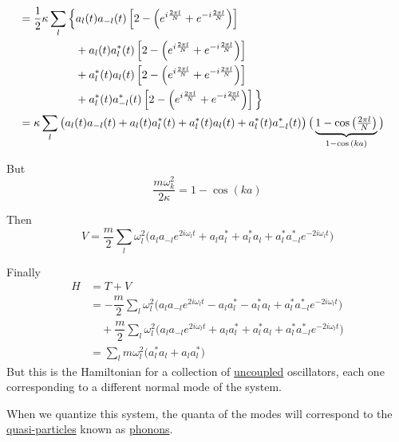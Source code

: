 \documentclass{article}
\begin{document}
\begin{align*}
    \\
    &= \frac{1}{2} \kappa \sum_l \Big\lbrace a_l (t) a_{-l} (t) \left[ 2 - \left( e^{i \frac{2 \pi l}{N}} + e^{-i \frac{2 \pi l}{N}} \right) \right] \\
    & \hspace{0.7in} + a_l (t) a_l^* (t) \left[ 2 - \left( e^{i \frac{2 \pi l}{N}} + e^{-i \frac{2 \pi l}{N}} \right) \right] \\
    & \hspace{0.7in} + a_l^* (t) a_l (t) \left[ 2 - \left( e^{i \frac{2 \pi l}{N}} + e^{-i \frac{2 \pi l}{N}} \right) \right] \\
    & \hspace{0.7in} + a_l^* (t) a_{-l}^* (t) \left[ 2 - \left( e^{i \frac{2 \pi l}{N}} + e^{-i \frac{2 \pi l}{N}} \right) \right] \Big\rbrace \\
    &= \kappa \sum_l \left( a_l (t) a_{-l} (t) + a_l (t) a_l^* (t) + a_l^* (t) a_l (t) + a_l^* (t) a_{-l}^* (t) \right) \big( \underbrace{ 1 - \cos{\left( \tfrac{ 2 \pi l }{N} \right)} }_{ 1 - \cos{(ka)} } \big)
\end{align*}
\endgroup


\noindent But
\begin{equation*}
    \dfrac{ m \omega_k^2 }{ 2 \kappa } =  1 - \cos{(ka)}
\end{equation*}

\noindent Then
\begin{equation*}
    V = \dfrac{m}{2} \sum_l \omega_l^2 \Big( a_l a_{-l} e^{ 2i \omega_l t } + a_l a_l^* + a_l^* a_l + a_l^* a_{-l}^* e^{ -2i \omega_l t } \Big)
\end{equation*}

\noindent Finally
\begin{align*}
    H &= T + V \\
    &= - \dfrac{m}{2} \sum_l \omega_l^2 \Big( a_l a_{-l} e^{ 2i \omega_l t } - a_l a_l^* - a_l^* a_l + a_l^* a_{-l}^* e^{ -2i \omega_l t } \Big) \\
    & \quad + \dfrac{m}{2} \sum_l \omega_l^2 \Big( a_l a_{-l} e^{ 2i \omega_l t } + a_l a_l^* + a_l^* a_l + a_l^* a_{-l}^* e^{ -2i \omega_l t } \Big) \\
    &= \sum_l m \omega_l^2 \Big( a_l^* a_l + a_l a_l^* \Big)
\end{align*}
But this is the Hamiltonian for a collection of \underline{uncoupled} oscillators, each one corresponding to a different normal mode of the system.

\noindent When we quantize this system, the quanta of the modes will correspond to the \underline{quasi-particles} known as \underline{phonons}.
\end{document}
